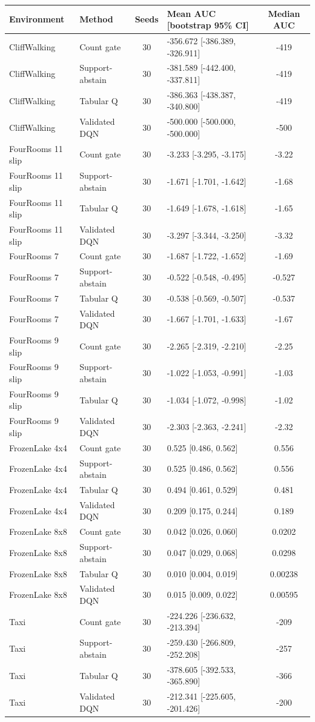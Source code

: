 \begin{tabular}{llclc}
\toprule
Environment & Method & Seeds & Mean AUC [bootstrap 95\% CI] & Median AUC \\
\midrule
CliffWalking & Count gate & 30 & -356.672 [-386.389, -326.911] & -419 \\
CliffWalking & Support-abstain & 30 & -381.589 [-442.400, -337.811] & -419 \\
CliffWalking & Tabular Q & 30 & -386.363 [-438.387, -340.800] & -419 \\
CliffWalking & Validated DQN & 30 & -500.000 [-500.000, -500.000] & -500 \\
FourRooms 11 slip & Count gate & 30 & -3.233 [-3.295, -3.175] & -3.22 \\
FourRooms 11 slip & Support-abstain & 30 & -1.671 [-1.701, -1.642] & -1.68 \\
FourRooms 11 slip & Tabular Q & 30 & -1.649 [-1.678, -1.618] & -1.65 \\
FourRooms 11 slip & Validated DQN & 30 & -3.297 [-3.344, -3.250] & -3.32 \\
FourRooms 7 & Count gate & 30 & -1.687 [-1.722, -1.652] & -1.69 \\
FourRooms 7 & Support-abstain & 30 & -0.522 [-0.548, -0.495] & -0.527 \\
FourRooms 7 & Tabular Q & 30 & -0.538 [-0.569, -0.507] & -0.537 \\
FourRooms 7 & Validated DQN & 30 & -1.667 [-1.701, -1.633] & -1.67 \\
FourRooms 9 slip & Count gate & 30 & -2.265 [-2.319, -2.210] & -2.25 \\
FourRooms 9 slip & Support-abstain & 30 & -1.022 [-1.053, -0.991] & -1.03 \\
FourRooms 9 slip & Tabular Q & 30 & -1.034 [-1.072, -0.998] & -1.02 \\
FourRooms 9 slip & Validated DQN & 30 & -2.303 [-2.363, -2.241] & -2.32 \\
FrozenLake 4x4 & Count gate & 30 & 0.525 [0.486, 0.562] & 0.556 \\
FrozenLake 4x4 & Support-abstain & 30 & 0.525 [0.486, 0.562] & 0.556 \\
FrozenLake 4x4 & Tabular Q & 30 & 0.494 [0.461, 0.529] & 0.481 \\
FrozenLake 4x4 & Validated DQN & 30 & 0.209 [0.175, 0.244] & 0.189 \\
FrozenLake 8x8 & Count gate & 30 & 0.042 [0.026, 0.060] & 0.0202 \\
FrozenLake 8x8 & Support-abstain & 30 & 0.047 [0.029, 0.068] & 0.0298 \\
FrozenLake 8x8 & Tabular Q & 30 & 0.010 [0.004, 0.019] & 0.00238 \\
FrozenLake 8x8 & Validated DQN & 30 & 0.015 [0.009, 0.022] & 0.00595 \\
Taxi & Count gate & 30 & -224.226 [-236.632, -213.394] & -209 \\
Taxi & Support-abstain & 30 & -259.430 [-266.809, -252.208] & -257 \\
Taxi & Tabular Q & 30 & -378.605 [-392.533, -365.890] & -366 \\
Taxi & Validated DQN & 30 & -212.341 [-225.605, -201.426] & -200 \\
\bottomrule
\end{tabular}
